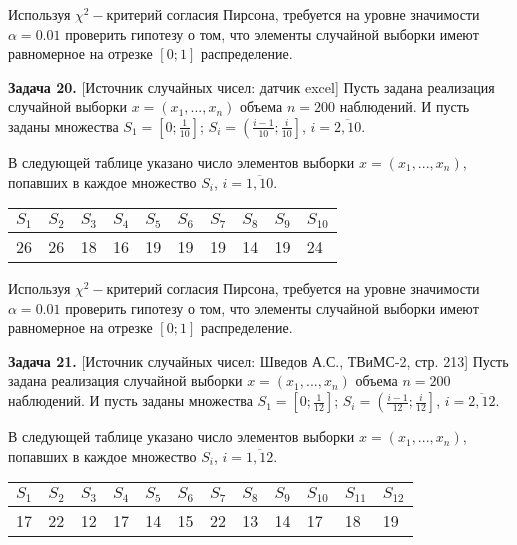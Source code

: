 Используя $\chi ^{2} -$критерий согласия Пирсона, требуется на уровне значимости $\alpha =0.01$ проверить гипотезу о том, что элементы случайной выборки имеют равномерное на отрезке $\left[0;1\right]$ распределение.



\textbf{Задача 20.} [Источник случайных чисел: датчик excel] Пусть задана реализация случайной выборки $x=\left(x_{1} ,...,x_{n} \right)$ объема $n=200$ наблюдений. И пусть заданы множества $S_{1} =\left[0;{\tfrac{1}{10}} \right]$; $S_{i} =\left({\tfrac{i-1}{10}} ;{\tfrac{i}{10}} \right]$, $i=\overline{2,10}$. 

В следующей таблице указано число элементов выборки $x=\left(x_{1} ,...,x_{n} \right)$, попавших в каждое множество $S_{i} $, $i=\overline{1,10}$.

\begin{tabular}{|p{0.3in}|p{0.3in}|p{0.3in}|p{0.3in}|p{0.3in}|p{0.3in}|p{0.3in}|p{0.3in}|p{0.3in}|p{0.3in}|} \hline 
$S_{1} $ & $S_{2} $ & $S_{3} $ & $S_{4} $ & $S_{5} $ & $S_{6} $ & $S_{7} $ & $S_{8} $ & $S_{9} $ & $S_{10} $ \\ \hline 
26 & 26 & 18 & 16 & 19 & 19 & 19 & 14 & 19 & 24 \\ \hline 
\end{tabular}



Используя $\chi ^{2} -$критерий согласия Пирсона, требуется на уровне значимости $\alpha =0.01$ проверить гипотезу о том, что элементы случайной выборки имеют равномерное на отрезке $\left[0;1\right]$ распределение.



\textbf{Задача 21.} [Источник случайных чисел: Шведов А.С., ТВиМС-2, стр. 213] Пусть задана реализация случайной выборки $x=\left(x_{1} ,...,x_{n} \right)$ объема $n=200$ наблюдений. И пусть заданы множества $S_{1} =\left[0;{\tfrac{1}{12}} \right]$; $S_{i} =\left({\tfrac{i-1}{12}} ;{\tfrac{i}{12}} \right]$, $i=\overline{2,12}$. 

В следующей таблице указано число элементов выборки $x=\left(x_{1} ,...,x_{n} \right)$, попавших в каждое множество $S_{i} $, $i=\overline{1,12}$.

\begin{tabular}{|p{0.3in}|p{0.3in}|p{0.3in}|p{0.3in}|p{0.3in}|p{0.3in}|p{0.3in}|p{0.3in}|p{0.3in}|p{0.3in}|p{0.3in}|p{0.3in}|} \hline 
$S_{1} $ & $S_{2} $ & $S_{3} $ & $S_{4} $ & $S_{5} $ & $S_{6} $ & $S_{7} $ & $S_{8} $ & $S_{9} $ & $S_{10} $ & $S_{11} $ & $S_{12} $ \\ \hline 
17 & 22 & 12 & 17 & 14 & 15 & 22 & 13 & 14 & 17 & 18 & 19 \\ \hline 
\end{tabular}



